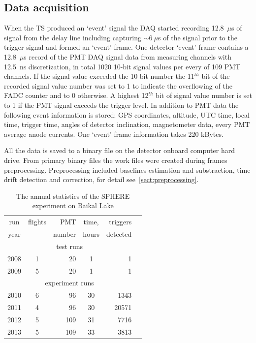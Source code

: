 \documentclass[final,5p,times,twocolumn]{elsarticle}
\begin{document}
\subsection{Data acquisition} 
When the TS produced an `event' signal the DAQ started recording 12.8~$\mu$s of signal from the delay line including capturing $\sim 6~\mu$s of the signal prior to the trigger signal and formed an `event' frame. One detector `event' frame contains a 12.8~$\mu$s record of the PMT DAQ signal data from measuring channels with 12.5~ns discretization, in total 1020 10-bit signal values per every of 109 PMT channels. If the signal value exceeded the 10-bit number the 11$^{th}$ bit of the recorded signal value number was set to 1 to indicate the overflowing of the FADC counter and to 0 otherwise. A highest 12$^{th}$ bit of signal value number is set to 1 if the PMT signal exceeds the trigger level. In addition to PMT data the following event information is stored: GPS  coordinates, altitude, UTC time, local time, trigger time, angles of detector inclination, magnetometer data, every PMT average anode currents. One `event' frame information takes 220 kBytes.

All the data is saved to a binary file on the detector onboard computer hard drive. From primary binary files the work files were created during frames preprocessing. Preprocessing included baselines estimation and substraction, time drift detection and correction, for detail see~\ref{sect:preprocessing}.


\begin{table}[b]
\centering
\caption{The annual statistics of the SPHERE experiment on Baikal Lake}
\label{tab:statistics}
\vspace{1pc}
\begin{tabular}{|c||c|r|c|r|r|}
\hline
run  & flights & PMT    & time, & triggers \\ 
year &         & number & hours & detected \\ 
\hline \hline
\multicolumn{5}{|c|}{test runs} \\
\hline
2008 & 1 &  20 &  1 &     1 \\ 
2009 & 5 &  20 &  1 &     1 \\ 
\hline
\multicolumn{5}{|c|}{experiment runs} \\
\hline
2010 & 6 &  96 & 30 &  1343 \\
2011 & 4 &  96 & 30 & 20571 \\
2012 & 5 & 109 & 31 &  7716 \\
2013 & 5 & 109 & 33 &  3813 \\
\hline
\end{tabular}
\end{table}
\end{document}
